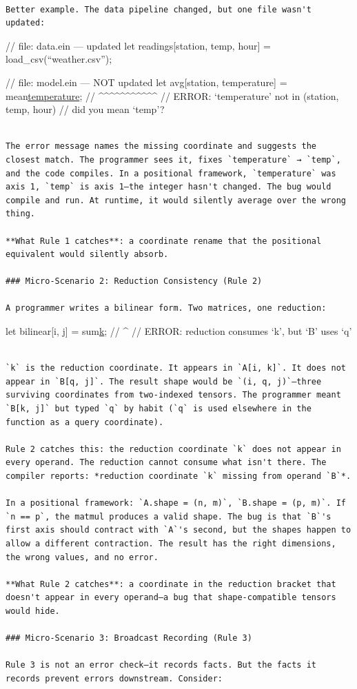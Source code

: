 \documentclass[11pt,titlepage]{article}
\begin{document}
\begin{verbatim}

Better example. The data pipeline changed, but one file wasn't updated:
\end{verbatim}

// file: data.ein --- updated let readings{[}station, temp, hour{]} =
load\_csv(``weather.csv'');

// file: model.ein --- NOT updated let avg{[}station, temperature{]} =
mean\href{readings\%5Bstation,\%20temperature,\%20hour\%5D}{temperature};
// \^{}\^{}\^{}\^{}\^{}\^{}\^{}\^{}\^{}\^{}\^{} // ERROR: `temperature'
not in (station, temp, hour) // did you mean `temp'?

\begin{verbatim}

The error message names the missing coordinate and suggests the closest match. The programmer sees it, fixes `temperature` → `temp`, and the code compiles. In a positional framework, `temperature` was axis 1, `temp` is axis 1—the integer hasn't changed. The bug would compile and run. At runtime, it would silently average over the wrong thing.

**What Rule 1 catches**: a coordinate rename that the positional equivalent would silently absorb.

### Micro-Scenario 2: Reduction Consistency (Rule 2)

A programmer writes a bilinear form. Two matrices, one reduction:
\end{verbatim}

let bilinear{[}i, j{]} =
sum\href{A\%5Bi,\%20k\%5D\%20*\%20B\%5Bq,\%20j\%5D}{k}; // \^{} //
ERROR: reduction consumes `k', but `B' uses `q'

\begin{verbatim}

`k` is the reduction coordinate. It appears in `A[i, k]`. It does not appear in `B[q, j]`. The result shape would be `(i, q, j)`—three surviving coordinates from two-indexed tensors. The programmer meant `B[k, j]` but typed `q` by habit (`q` is used elsewhere in the function as a query coordinate).

Rule 2 catches this: the reduction coordinate `k` does not appear in every operand. The reduction cannot consume what isn't there. The compiler reports: *reduction coordinate `k` missing from operand `B`*.

In a positional framework: `A.shape = (n, m)`, `B.shape = (p, m)`. If `n == p`, the matmul produces a valid shape. The bug is that `B`'s first axis should contract with `A`'s second, but the shapes happen to allow a different contraction. The result has the right dimensions, the wrong values, and no error.

**What Rule 2 catches**: a coordinate in the reduction bracket that doesn't appear in every operand—a bug that shape-compatible tensors would hide.

### Micro-Scenario 3: Broadcast Recording (Rule 3)

Rule 3 is not an error check—it records facts. But the facts it records prevent errors downstream. Consider:
\end{verbatim}
\end{document}
